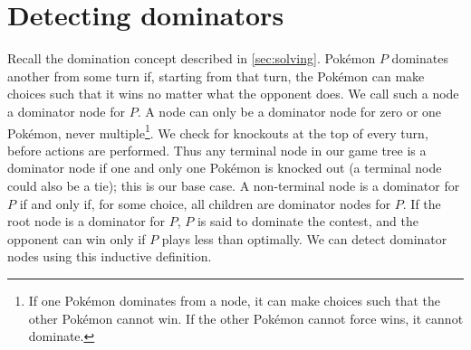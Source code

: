\section{Detecting dominators\label{sec:dominators}}
Recall the domination concept described in \autoref{sec:solving}.
Pokémon $P$ dominates another from some turn if, starting from that turn, the Pokémon
 can make choices such that it wins no matter what the opponent does.
We call such a node a dominator node for $P$.
A node can only be a dominator node for zero or one Pokémon, never multiple\footnote{If one Pokémon dominates
 from a node, it can make choices such that the other Pokémon cannot win. If the other Pokémon cannot
 force wins, it cannot dominate.}.
We check for knockouts at the top of every turn, before actions are performed.
Thus any terminal node in our game tree is a dominator node if one and only one Pokémon
 is knocked out (a terminal node could also be a tie); this is our base case.
A non-terminal node is a dominator for $P$ if and only if, for some choice, all children
 are dominator nodes for $P$.
If the root node is a dominator for $P$, $P$ is said to dominate the contest, and the
 opponent can win only if $P$ plays less than optimally.
We can detect dominator nodes using this inductive definition.
